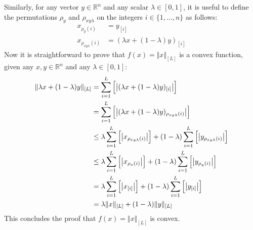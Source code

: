 Similarly, for any vector $y\in\mathbb{R}^n$ and any scalar $\lambda\in[0, 1]$, it is useful to define the permutations $\rho_y$ and $\rho_{xy\lambda}$ on the integers $i\in\{1,\hdots,n\}$ as follows:
\begin{align*}
    x_{\rho_y(i)} &= y_{[i]} \\
    x_{\rho_{xy\lambda}(i)} &= (\lambda x + (1 - \lambda)y)_{[i]}
\end{align*}
Now it is straightforward to prove that $f(x) = \Vert x \Vert_{[L]}$ is a convex function, given any $x, y\in\mathbb{R}^n$ and any $\lambda\in[0, 1]$:
\begin{align*}
    \Vert \lambda x + (1 - \lambda)y \Vert_{[L]} &= \sum_{i=1}^L{\Bigl[ \left\vert (\lambda x + (1 - \lambda)y)_{[i]} \right\vert \Bigr]} \\
    &= \sum_{i=1}^L{\Bigl[ \left\vert (\lambda x + (1 - \lambda)y)_{\rho_{xy\lambda}(i)} \right\vert \Bigr]} \\
    &\le \lambda\sum_{i=1}^L{\Bigl[ \left\vert x_{\rho_{xy\lambda}(i)} \right\vert \Bigr]} + (1 - \lambda)\sum_{i=1}^L{\Bigl[ \left\vert y_{\rho_{xy\lambda}(i)} \right\vert \Bigr]} \\
    &\le \lambda\sum_{i=1}^L{\Bigl[ \left\vert x_{\rho_x(i)} \right\vert \Bigr]} + (1 - \lambda)\sum_{i=1}^L{\Bigl[ \left\vert y_{\rho_y(i)} \right\vert \Bigr]} \\
    &= \lambda\sum_{i=1}^L{\Bigl[ \left\vert x_{[i]} \right\vert \Bigr]} + (1 - \lambda)\sum_{i=1}^L{\Bigl[ \left\vert y_{[i]} \right\vert \Bigr]} \\
    &= \lambda\Vert x \Vert_{[L]} + (1 - \lambda)\Vert y \Vert_{[L]}
\end{align*}
This concludes the proof that $f(x) = \Vert x \Vert_{[L]}$ is convex.
